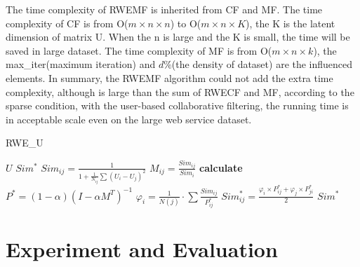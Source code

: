 \documentclass[conference]{IEEEtran}
\begin{document}
\par The time complexity of RWEMF is inherited from CF and MF. The time complexity of CF is from O($m \times n \times n$) to O($m \times n \times K$), the K is the latent dimension of matrix U. When the n is large and the K is small, the time will be saved in large dataset. The time complexity of MF is from O($m \times n \times k$), the max\_iter(maximum iteration) and $d \%$(the density of dataset) are the influenced elements. In summary, the RWEMF algorithm could not add the extra time complexity, although is large than the sum of RWECF and MF, according to the sparse condition, with the user-based collaborative filtering, the running time\cite{wang_collaborative_2015} is in acceptable scale even on the large web service dataset.

\begin{algorithm}  
\caption{RWE\_U}  
\label{alg_RWE}  
\begin{algorithmic}
\REQUIRE $U$ 
\ENSURE $Sim^{*}$
        \STATE $Sim_{ij}=\frac{1}{1+\frac{1}{N_{ij}}\sum{(U_{i}-U_{j})^2}}$
    \ENDFOR
\ENDFOR
        \STATE $M_{ij}=\frac{Sim_{ij}}{Sim_{i}}$
    \ENDFOR
\ENDFOR
\STATE \textbf{calculate} $P^{*}=(1-\alpha)(I-\alpha M^{T})^{-1}$
        \STATE $\varphi_{i}=\frac{1}{N(j)} \cdot \sum{\frac{Sim_{ij}}{P^{*}_{ij}}} $    
        \STATE $Sim_{ij}^{*}=\frac
{\varphi_{i} \times P^{*}_{ij} + \varphi_{j} \times P^{*}_{ji}
}{2}$
    \ENDFOR
\ENDFOR
\RETURN $Sim^{*}$
\end{algorithmic}  
\end{algorithm} 

\section{Experiment and Evaluation}\label{S-EE}
\end{document}
